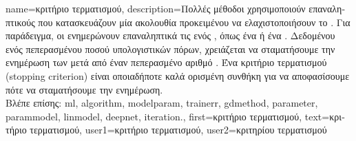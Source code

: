 {name={\foreignlanguage{greek}{κριτήριο τερματισμού}},
	description={\foreignlanguage{greek}{Πολλές μέθοδοι} 
		 \foreignlanguage{greek}{χρησιμοποι\-ούν επαναληπτικούς}  
		\foreignlanguage{greek}{που κατασκευάζουν μία ακολουθία}  
		\foreignlanguage{greek}{προκειμένου να ελαχιστοποιήσουν το} . 
		\foreignlanguage{greek}{Για παράδειγμα, οι}  \foreignlanguage{greek}{ενημερώνουν 
		επαναληπτικά τις}  \foreignlanguage{greek}{ενός} , 
		\foreignlanguage{greek}{όπως ένα}  \foreignlanguage{greek}{ή ένα} . 
		\foreignlanguage{greek}{Δεδομένου ενός πεπερασμένου ποσού υπολογιστικών πόρων, χρειάζεται να σταματήσουμε
		την ενημέρωση των}  \foreignlanguage{greek}{μετά από έναν πεπερασμένο αριθμό} 
		. \foreignlanguage{greek}{Ένα κριτήριο τερματισμού} (stopping criterion) \foreignlanguage{greek}{είναι 
		οποιαδήποτε καλά ορισμένη συνθήκη για να αποφασίσουμε πότε να σταματήσουμε την ενημέρωση.} 
		\\
		\foreignlanguage{greek}{Βλέπε επίσης:} \gls{ml}, \gls{algorithm}, \gls{modelparam}, \gls{trainerr}, \gls{gdmethod}, 
		\gls{parameter}, \gls{parammodel}, \gls{linmodel}, \gls{deepnet}, \gls{iteration}.},
	first={\foreignlanguage{greek}{κριτήριο τερματισμού}},
	text={\foreignlanguage{greek}{κριτήριο τερματισμού}},
	user1={\foreignlanguage{greek}{κριτήριο τερματισμού}}, %
	user2={\foreignlanguage{greek}{κριτηρίου τερματισμού}} %
}

